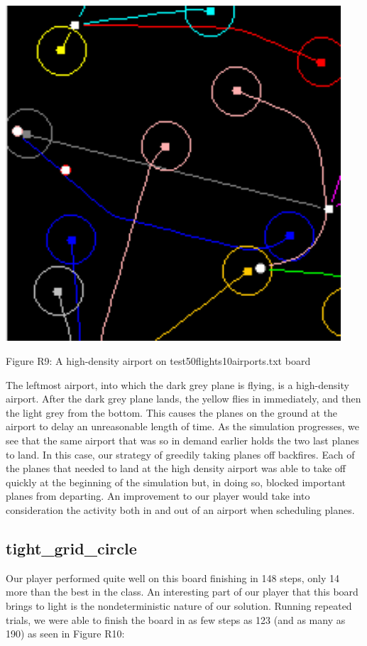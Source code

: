 \documentclass[10pt]{article}
\begin{document}
\includegraphics[width=125mm]{pics/R9.png}
\caption{Figure R9: A high-density airport on test50flights10airports.txt board}

The leftmost airport, into which the dark grey plane is flying, is a high-density airport. After the dark grey plane lands, the yellow flies in immediately, and then the light grey from the bottom. This causes the planes on the ground at the airport to delay an unreasonable length of time. As the simulation progresses, we see that the same airport that was so in demand earlier holds the two last planes to land. In this case, our strategy of greedily taking planes off backfires. Each of the planes that needed to land at the high density airport was able to take off quickly at the beginning of the simulation but, in doing so, blocked important planes from departing. An improvement to our player would take into consideration the activity both in and out of an airport when scheduling planes.

\subsection{tight_grid_circle}

Our player performed quite well on this board finishing in 148 steps, only 14 more than the best in the class. An interesting part of our player that this board brings to light is the nondeterministic nature of our solution. Running repeated trials, we were able to finish the board in as few steps as 123 (and as many as 190) as seen in Figure R10:
\end{document}
